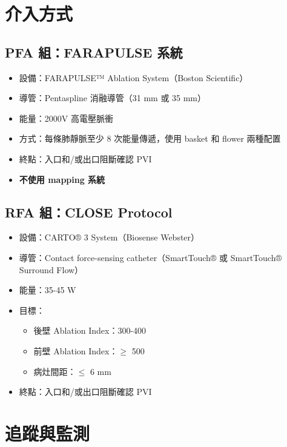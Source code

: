 \documentclass[12pt,a4paper]{article}
\begin{document}
\section{介入方式}

\subsection{PFA 組：FARAPULSE 系統}

\begin{itemize}
    \item 設備：FARAPULSE™ Ablation System（Boston Scientific）
    \item 導管：Pentaspline 消融導管（31 mm 或 35 mm）
    \item 能量：2000V 高電壓脈衝
    \item 方式：每條肺靜脈至少 8 次能量傳遞，使用 basket 和 flower 兩種配置
    \item 終點：入口和/或出口阻斷確認 PVI
    \item \textbf{不使用 mapping 系統}
\end{itemize}

\subsection{RFA 組：CLOSE Protocol}

\begin{itemize}
    \item 設備：CARTO® 3 System（Biosense Webster）
    \item 導管：Contact force-sensing catheter（SmartTouch® 或 SmartTouch® Surround Flow）
    \item 能量：35-45 W
    \item 目標：
    \begin{itemize}
        \item 後壁 Ablation Index：300-400
        \item 前壁 Ablation Index：$\geq$ 500
        \item 病灶間距：$\leq$ 6 mm
    \end{itemize}
    \item 終點：入口和/或出口阻斷確認 PVI
\end{itemize}

\section{追蹤與監測}
\end{document}
